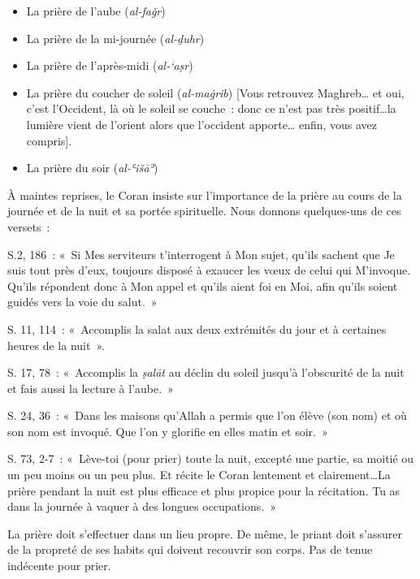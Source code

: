 \begin{itemize}
\item
  La prière de l'aube (\emph{al-faǧr})
\item
  La prière de la mi-journée (\emph{al-ḏuhr})
\item
  La prière de l'après-midi (\emph{al-`aṣr})
\item
  La prière du coucher de soleil (\emph{al-maġrib}) {[}Vous retrouvez
  Maghreb\ldots{} et oui, c'est l'Occident, là où le soleil se couche~:
  donc ce n'est pas très positif\ldots la lumière vient de l'orient
  alors que l'occident apporte\ldots{} enfin, vous avez compris{]}.
\item
  La prière du soir (\emph{al-ʿišāʾ})
\end{itemize}

À maintes reprises, le Coran insiste sur l'importance de la prière au
cours de la journée et de la nuit et sa portée spirituelle. Nous donnons
quelques-uns de ces versets~:

S.2, 186~: «~Si Mes serviteurs t'interrogent à Mon sujet, qu'ils sachent
que Je suis tout près d'eux, toujours disposé à exaucer les vœux de
celui qui M'invoque. Qu'ils répondent donc à Mon appel et qu'ils aient
foi en Moi, afin qu'ils soient guidés vers la voie du salut.~»

S. 11, 114~: «~Accomplis la salat aux deux extrémités du jour et à
certaines heures de la nuit~».

S. 17, 78~: «~Accomplis la \emph{ṣalāt} au déclin du soleil jusqu'à
l'obscurité de la nuit et fais aussi la lecture à l'aube.~»

S. 24, 36~: «~Dans les maisons qu'Allah a permis que l'on élève (son
nom) et où son nom est invoqué. Que l'on y glorifie en elles matin et
soir.~»

S. 73, 2-7~: «~Lève-toi (pour prier) toute la nuit, excepté une partie,
sa moitié ou un peu moins ou un peu plus. Et récite le Coran lentement
et clairement\ldots La prière pendant la nuit est plus efficace et plus
propice pour la récitation. Tu as dans la journée à vaquer à des longues
occupations.~»


La prière doit s'effectuer dans un lieu propre. De même, le priant doit
s'assurer de la propreté de ses habits qui doivent recouvrir son corps.
Pas de tenue indécente pour prier.

